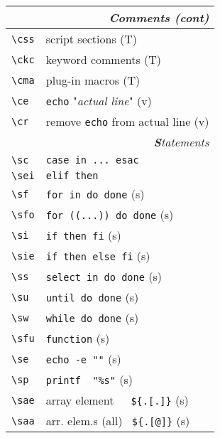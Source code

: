 \documentclass[oneside,11pt,landscape,DIV16]{scrartcl}
\begin{document}
\begin{multicols}{3}
\begin{center}
\begin{tabular}[]{|p{11mm}|p{60mm}|}
\hline
\multicolumn{2}{|r|}{\textsl{\textbf{C}omments (cont)}}                       \\[1.0ex]
\hline     \verb'\css'  & script sections                       \hfill (T)\\
\hline     \verb'\ckc'  & keyword comments                      \hfill (T)\\
\hline     \verb'\cma'  & plug-in macros                        \hfill (T)\\
%
\hline     \verb'\ce'   & \texttt{echo} "\textsl{actual line}"  \hfill (v)\\
\hline     \verb'\cr'   & remove \texttt{echo} from actual line \hfill (v)\\
\hline
\hline
\multicolumn{2}{|r|}{\textsl{\textbf{S}tatements}}                    \\[1.0ex]
\hline \verb'\sc'  & \verb'case in ... esac'               \\
\hline \verb'\sei' & \verb'elif then'                      \\
\hline \verb'\sf'  & \verb'for in do done'                 \hfill (s)\\
\hline \verb'\sfo' & \verb'for ((...)) do done'            \hfill (s)\\
\hline \verb'\si'  & \verb'if then fi'                     \hfill (s)\\
\hline \verb'\sie' & \verb'if then else fi'                \hfill (s)\\
\hline \verb'\ss'  & \verb'select in do done'              \hfill (s)\\
\hline \verb'\su'  & \verb'until do done'                  \hfill (s)\\
\hline \verb'\sw'  & \verb'while do done'                  \hfill (s)\\
\hline \verb'\sfu' & \verb'function'                       \hfill (s)\\
%
\hline \verb'\se'  & \verb'echo -e ""'                     \hfill (s)\\
\hline \verb'\sp'  & \verb'printf  "%s"'                   \hfill (s)\\
%
\hline \verb'\sae' & array element\ \ \ \verb'${.[.]}'     \hfill (s)\\
\hline \verb'\saa' & arr. elem.s (all) \ \verb'${.[@]}'    \hfill (s)\\

\end{tabular}
\end{center}
\end{multicols}
\end{document}
